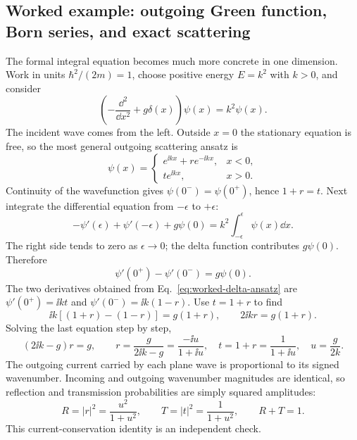 \subsection*{Worked example: outgoing Green function, Born series, and exact scattering}
The formal integral equation becomes much more concrete in
one dimension. Work in units $\hbar^2/(2m)=1$, choose
positive energy $E=k^2$ with $k>0$, and consider
\begin{equation}
\left(-\frac{\dd^2}{\dd x^2}+g\delta(x)\right)
\psi(x)=k^2\psi(x).
\end{equation}
The incident wave comes from the left. Outside $x=0$
the stationary equation is free, so the most general
outgoing scattering ansatz is
\begin{equation}
\psi(x)=
\begin{cases}
e^{\ii kx}+r e^{-\ii kx},&x<0,\\
t e^{\ii kx},&x>0.
\end{cases}
\label{eq:worked-delta-ansatz}
\end{equation}
Continuity of the wavefunction gives $\psi(0^-)=\psi(0^+)$,
hence $1+r=t$. Next integrate the differential equation
from $-\epsilon$ to $+\epsilon$:
\begin{equation}
-\psi'(\epsilon)+\psi'(-\epsilon)+g\psi(0)
=k^2\int_{-\epsilon}^\epsilon\psi(x)\dd x.
\end{equation}
The right side tends to zero as $\epsilon\to0$;
the delta function contributes $g\psi(0)$. Therefore
\begin{equation}
\psi'(0^+)-\psi'(0^-)=g\psi(0).
\end{equation}
The two derivatives obtained from
Eq.~\eqref{eq:worked-delta-ansatz} are
$\psi'(0^+)=\ii kt$ and $\psi'(0^-)=\ii k(1-r)$.
Use $t=1+r$ to find
\begin{equation}
\ii k[(1+r)-(1-r)]=g(1+r),
\qquad 2\ii kr=g(1+r).
\end{equation}
Solving the last equation step by step,
\begin{equation}
(2\ii k-g)r=g,\qquad
r=\frac{g}{2\ii k-g}
=\boxed{\frac{-\ii u}{1+\ii u}},
\quad
t=1+r=\boxed{\frac1{1+\ii u}},
\quad u=\frac{g}{2k}.
\label{eq:worked-delta-amplitudes}
\end{equation}
The outgoing current carried by each plane wave is proportional
to its signed wavenumber. Incoming and outgoing wavenumber
magnitudes are identical, so reflection and transmission
probabilities are simply squared amplitudes:
\begin{equation}
R=|r|^2=\frac{u^2}{1+u^2},\qquad
T=|t|^2=\frac1{1+u^2},\qquad
\boxed{R+T=1}.
\end{equation}
This current-conservation identity is an independent check.

